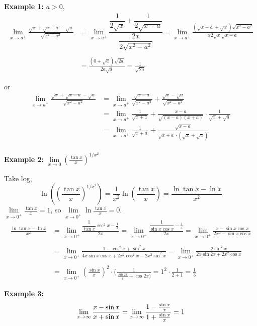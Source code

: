 \documentclass[12pt]{article}
\theoremstyle{plain}
\newcommand{\dlim}{\displaystyle\lim\limits}
\begin{document}
	{\color{Brown}\textbf{Example 1: } 
		$a>0$,
		\begin{align*}
		\dlim_{x\to a^+} \frac{\sqrt x + \sqrt{x-a} -\sqrt a}{\sqrt{x^2-a^2}}
		&= \dlim_{x\to a^+} \dfrac{\dfrac1{2\sqrt x}+\dfrac1{2\sqrt{x-a}}}
		{\dfrac{2x}{2\sqrt{x^2-a^2}}}
		= \dlim_{x\to a^+} \frac{(\sqrt{x-a}+\sqrt x)\sqrt{x^2-a^2}}
		{x2\sqrt x\sqrt{x-a}}\\\\
		&=\frac{(0+\sqrt a)\sqrt{2a}}{2a\sqrt a} = \frac1{\sqrt{2a}}
		\end{align*}

	or
		\begin{align*}
			\dlim_{x\to a^+} \frac{\sqrt x + \sqrt{x-a} -\sqrt a}{\sqrt{x^2-a^2}}
			&= \dlim_{x\to a^+} \frac{\sqrt{x-a}}{\sqrt{x^2-a^2}}+
			\frac{\sqrt x-\sqrt a}{\sqrt{x^2-a^2}} \\
			&=\dlim_{x\to a^+} \frac1{\sqrt {x+1}}+\frac{x-a}{\sqrt{(x-a)(x+a)}}
			\cdot \frac1{\sqrt x+ \sqrt a} \\
			&= \dlim_{x\to a^+}\frac1{\sqrt {x+a}} +\frac{\sqrt{x-a}}
			{\sqrt {x+a}\cdot (\sqrt x+ \sqrt a)}\\
		\end{align*}

		\textbf{Example 2: }
		$\dlim_{x\to 0} (\frac{\tan x}x)^{1/x^2}$ 

		Take log, 
		\[
			\ln ((\frac{\tan x}x)^{1/x^2}) = \frac1{x^2}\ln (\frac{\tan x}x)
			= \frac{\ln \tan x - \ln x}{x^2}
		\]
		$\dlim_{x\to 0^+}\frac{\tan x}x=1$,
		so $\dlim_{x\to 0 ^+}\ln \frac{\tan x}x = 0$.
		\begin{align*}
			\frac{\ln \tan x - \ln x}{x^2} 
			&= \dlim_{x\to 0 ^+} \frac{\dfrac1{\tan x} \sec^2 x -\frac1x} {2x}
			=\dlim_{x\to 0^+} \frac{\dfrac1{\sin x \cos x}-\frac1x} {2x}
			=\dlim_{x\to 0^+}\frac{x-\sin x\cos x}{2x^2-\sin x \cos x} \\\\
			&=\dlim_{x\to 0^+}\frac{1-\cos^2 x + \sin ^2 x}
			{4x\sin x\cos x + 2x^2\cos ^ 2 x - 2x^2 \sin^2 x}
			=\dlim_{x\to 0^+}\frac{2\sin^2 x}{2x\sin 2x + 2x^2 \cos x}\\\\
			&=\dlim_{x\to 0^+}(\frac{\sin x}x)^2 \cdot
			(\frac1{\frac{\sin 2x}x + \cos 2x)} 
			= 1^2 \cdot \frac{1}{2+1} = \frac13 
		\end{align*}

		\textbf{Example 3: }
		\[
			\dlim_{x\to \infty}\frac{x-\sin x}{x+\sin x} 
			=\dlim_{x\to \infty} \frac{1-\frac{\sin x}x}{1+\frac{\sin x}x} 
			=1\\
		\]
	}
\end{document}
